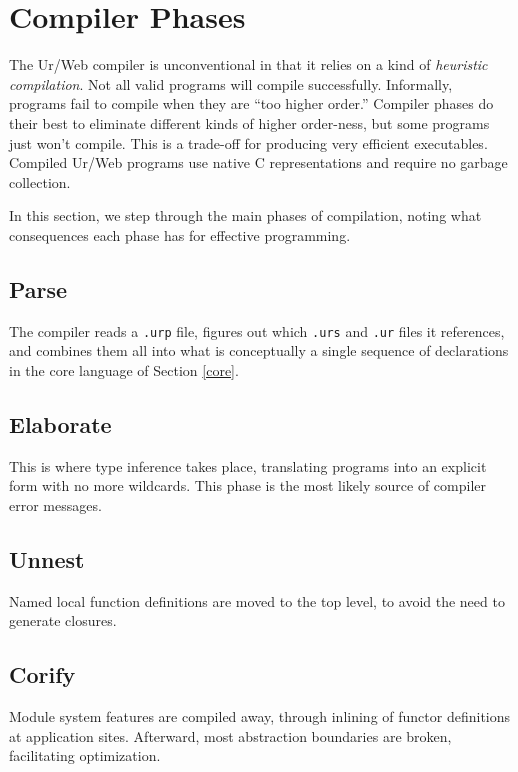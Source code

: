 \documentclass{article}
\begin{document}
\section{Compiler Phases}

The Ur/Web compiler is unconventional in that it relies on a kind of \emph{heuristic compilation}.  Not all valid programs will compile successfully.  Informally, programs fail to compile when they are ``too higher order.''  Compiler phases do their best to eliminate different kinds of higher order-ness, but some programs just won't compile.  This is a trade-off for producing very efficient executables.  Compiled Ur/Web programs use native C representations and require no garbage collection.

In this section, we step through the main phases of compilation, noting what consequences each phase has for effective programming.

\subsection{Parse}

The compiler reads a \texttt{.urp} file, figures out which \texttt{.urs} and \texttt{.ur} files it references, and combines them all into what is conceptually a single sequence of declarations in the core language of Section \ref{core}.

\subsection{Elaborate}

This is where type inference takes place, translating programs into an explicit form with no more wildcards.  This phase is the most likely source of compiler error messages.

\subsection{Unnest}

Named local function definitions are moved to the top level, to avoid the need to generate closures.

\subsection{Corify}

Module system features are compiled away, through inlining of functor definitions at application sites.  Afterward, most abstraction boundaries are broken, facilitating optimization.
\end{document}
